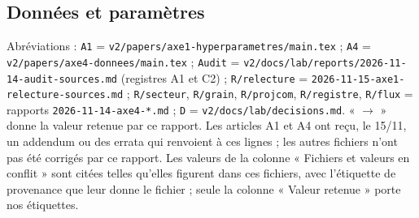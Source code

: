 \providecommand{\donfic}[1]{\nolinkurl{#1}}
\subsection{Données et paramètres}\label{don:ann}\label{par:ann}
\begingroup\setlength{\emergencystretch}{3em}%

Abréviations : \texttt{A1} = \donfic{v2/papers/axe1-hyperparametres/main.tex} ; \texttt{A4} =
\donfic{v2/papers/axe4-donnees/main.tex} ; \texttt{Audit} = \donfic{v2/docs/lab/reports/2026-11-14-audit-sources.md}
(registres A1 et C2) ; \donfic{R/relecture} = \donfic{2026-11-15-axe1-relecture-sources.md} ; \donfic{R/secteur},
\donfic{R/grain}, \donfic{R/projcom}, \donfic{R/registre}, \donfic{R/flux} = rapports
\donfic{2026-11-14-axe4-*.md} ; \texttt{D} = \donfic{v2/docs/lab/decisions.md}. « $\to$ » donne la valeur retenue
par ce rapport. Les articles A1 et A4 ont reçu, le 15/11, un addendum ou des errata qui renvoient à ces lignes ;
les autres fichiers n'ont pas été corrigés par ce rapport. Les valeurs de la colonne « Fichiers et valeurs en conflit » sont citées telles qu'elles figurent dans ces fichiers, avec l'étiquette de provenance que leur donne le fichier ; seule la colonne « Valeur retenue » porte nos étiquettes.

